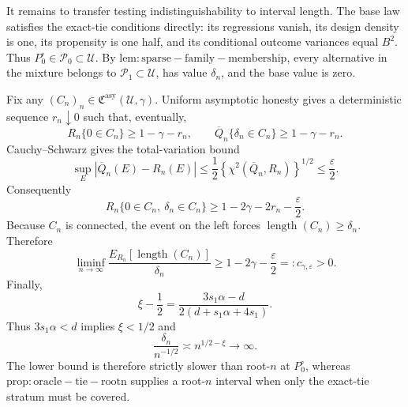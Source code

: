 It remains to transfer testing indistinguishability to interval length.  The base law satisfies the exact-tie conditions directly: its regressions vanish, its design density is one, its propensity is one half, and its conditional outcome variances equal \(B^2\).  Thus \(P_0^\circ\in\mathcal P_0\subset\mathcal U\).  By \(\mathrm{lem:sparse-family-membership}\), every alternative in the mixture belongs to \(\mathcal P_1\subset\mathcal U\), has value \(\delta_n\), and the base value is zero.

Fix any \((C_n)_n\in\mathfrak C^{\mathrm{asy}}(\mathcal U,\gamma)\).  Uniform asymptotic honesty gives a deterministic sequence \(r_n\downarrow0\) such that, eventually,
\[
 R_n\{0\in C_n\}\ge1-\gamma-r_n,
 \qquad
 \overline Q_n\{\delta_n\in C_n\}\ge1-\gamma-r_n.
\]
Cauchy--Schwarz gives the total-variation bound
\[
 \sup_E|\overline Q_n(E)-R_n(E)|
 \le\frac12\left\{\chi^2(\overline Q_n,R_n)\right\}^{1/2}
 \le\frac\varepsilon2.
\]
Consequently
\[
 R_n\{0\in C_n,\ \delta_n\in C_n\}
 \ge1-2\gamma-2r_n-\frac\varepsilon2.
\]
Because \(C_n\) is connected, the event on the left forces \(\operatorname{length}(C_n)\ge\delta_n\).  Therefore
\[
 \liminf_{n\to\infty}
 \frac{E_{R_n}[\operatorname{length}(C_n)]}{\delta_n}
 \ge1-2\gamma-\frac\varepsilon2
 =:c_{\gamma,\varepsilon}>0.
\]
Finally,
\[
 \xi-\frac12
 =\frac{3s_1\alpha-d}{2(d+s_1\alpha+4s_1)}.
\]
Thus \(3s_1\alpha<d\) implies \(\xi<1/2\) and
\[
 \frac{\delta_n}{n^{-1/2}}\asymp n^{1/2-\xi}\longrightarrow\infty.
\]
The lower bound is therefore strictly slower than root-\(n\) at \(P_0^\circ\), whereas \(\mathrm{prop:oracle-tie-rootn}\) supplies a root-\(n\) interval when only the exact-tie stratum must be covered.